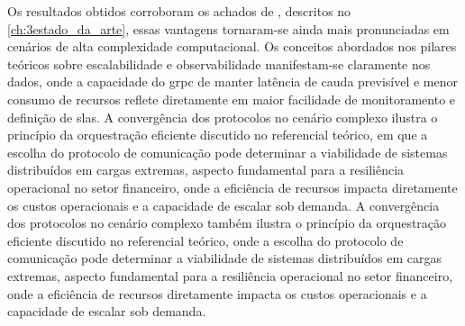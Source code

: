 Os resultados obtidos corroboram os achados de \textcite{niswar_performance_2024}, descritos no \autoref{ch:3estado_da_arte}, essas vantagens tornaram-se ainda mais pronunciadas em cenários de alta complexidade computacional. Os conceitos abordados nos pilares teóricos sobre escalabilidade e observabilidade manifestam-se claramente nos dados, onde a capacidade do \gls{grpc} de manter latência de cauda previsível e menor consumo de recursos reflete diretamente em maior facilidade de monitoramento e definição de \acrshort{sla}s. A convergência dos protocolos no cenário complexo ilustra o princípio da orquestração eficiente discutido no referencial teórico, em que a escolha do protocolo de comunicação pode determinar a viabilidade de sistemas distribuídos em cargas extremas, aspecto fundamental para a resiliência operacional no setor financeiro, onde a eficiência de recursos impacta diretamente os custos operacionais e a capacidade de escalar sob demanda. A convergência dos protocolos no cenário complexo também ilustra o princípio da orquestração eficiente discutido no referencial teórico, onde a escolha do protocolo de comunicação pode determinar a viabilidade de sistemas distribuídos em cargas extremas, aspecto fundamental para a resiliência operacional no setor financeiro, onde a eficiência de recursos diretamente impacta os custos operacionais e a capacidade de escalar sob demanda.